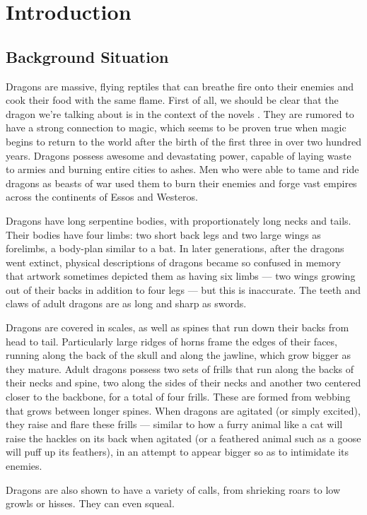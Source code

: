 \section{Introduction}
\subsection{Background Situation}
Dragons are massive, flying reptiles that can breathe fire onto their enemies and cook their food with the same flame. First of all, we should be clear that the dragon we're talking about is in the context of the novels . They are rumored to have a strong connection to magic, which seems to be proven true when magic begins to return to the world after the birth of the first three in over two hundred years. Dragons possess awesome and devastating power, capable of laying waste to armies and burning entire cities to ashes. Men who were able to tame and ride dragons as beasts of war used them to burn their enemies and forge vast empires across the continents of Essos and Westeros.

Dragons have long serpentine bodies, with proportionately long necks and tails. Their bodies have four limbs: two short back legs and two large wings as forelimbs, a body-plan similar to a bat. In later generations, after the dragons went extinct, physical descriptions of dragons became so confused in memory that artwork sometimes depicted them as having six limbs --- two wings growing out of their backs in addition to four legs --- but this is inaccurate. The teeth and claws of adult dragons are as long and sharp as swords.

Dragons are covered in scales, as well as spines that run down their backs from head to tail. Particularly large ridges of horns frame the edges of their faces, running along the back of the skull and along the jawline, which grow bigger as they mature. Adult dragons possess two sets of frills that run along the backs of their necks and spine, two along the sides of their necks and another two centered closer to the backbone, for a total of four frills. These are formed from webbing that grows between longer spines. When dragons are agitated (or simply excited), they raise and flare these frills --- similar to how a furry animal like a cat will raise the hackles on its back when agitated (or a feathered animal such as a goose will puff up its feathers), in an attempt to appear bigger so as to intimidate its enemies.

Dragons are also shown to have a variety of calls, from shrieking roars to low growls or hisses. They can even squeal. 

